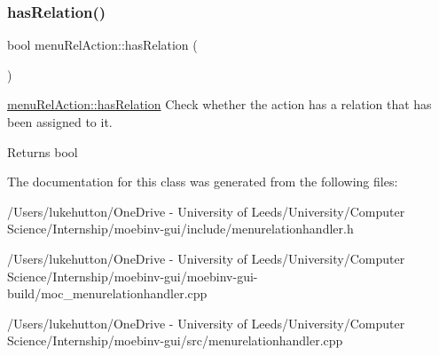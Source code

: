 \subsubsection{\texorpdfstring{has\+Relation()}{hasRelation()}}
{\footnotesize\ttfamily bool menu\+Rel\+Action\+::has\+Relation (\begin{DoxyParamCaption}{ }\end{DoxyParamCaption})}



\mbox{\hyperlink{classmenu_rel_action_a5e6339dbaf4cf0dc9543afdfc5b9e15a}{menu\+Rel\+Action\+::has\+Relation}} Check whether the action has a relation that has been assigned to it. 

\begin{DoxyReturn}{Returns}
bool 
\end{DoxyReturn}


The documentation for this class was generated from the following files\+:\begin{DoxyCompactItemize}
\item 
/\+Users/lukehutton/\+One\+Drive -\/ University of Leeds/\+University/\+Computer Science/\+Internship/moebinv-\/gui/include/menurelationhandler.\+h\item 
/\+Users/lukehutton/\+One\+Drive -\/ University of Leeds/\+University/\+Computer Science/\+Internship/moebinv-\/gui/moebinv-\/gui-\/build/moc\+\_\+menurelationhandler.\+cpp\item 
/\+Users/lukehutton/\+One\+Drive -\/ University of Leeds/\+University/\+Computer Science/\+Internship/moebinv-\/gui/src/menurelationhandler.\+cpp\end{DoxyCompactItemize}
